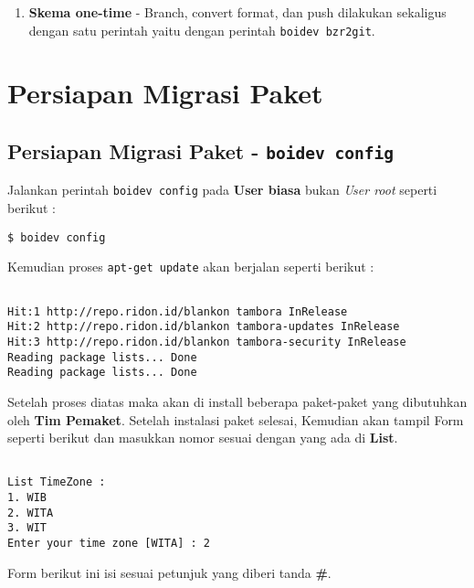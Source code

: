 {\begin{enumerate}
	\item \textbf{Skema one-time} - Branch, convert format, dan push dilakukan sekaligus dengan satu perintah yaitu dengan perintah \texttt{boidev bzr2git}.
	\label{itm:metode_one-time}
\end{enumerate}

\section{Persiapan Migrasi Paket}
\subsection{Persiapan Migrasi Paket - \texttt{boidev config}}
\label{implm_1}
\noindent
Jalankan perintah \texttt{boidev config} pada \textbf{User biasa} bukan \textit{User root} seperti berikut :

\begin{lstlisting}[language=ShellBash]
$ boidev config
\end{lstlisting}

\noindent
Kemudian proses \texttt{apt-get update} akan berjalan seperti berikut :

\begin{lstlisting}[language=ShellBash]

Hit:1 http://repo.ridon.id/blankon tambora InRelease
Hit:2 http://repo.ridon.id/blankon tambora-updates InRelease
Hit:3 http://repo.ridon.id/blankon tambora-security InRelease
Reading package lists... Done                      
Reading package lists... Done

\end{lstlisting}

\noindent
Setelah proses diatas maka akan di install beberapa paket-paket yang dibutuhkan oleh \textbf{Tim Pemaket}. Setelah instalasi paket selesai, Kemudian akan tampil Form seperti berikut dan masukkan nomor sesuai dengan yang ada di \textbf{List}.

\begin{lstlisting}[language=ShellBash]

List TimeZone : 
1. WIB 
2. WITA 
3. WIT 
Enter your time zone [WITA] : 2

\end{lstlisting}

\noindent
Form berikut ini isi sesuai petunjuk yang diberi tanda \textbf{\#}.

\begin{lstlisting}[language=ShellBash]


\end{lstlisting}}
